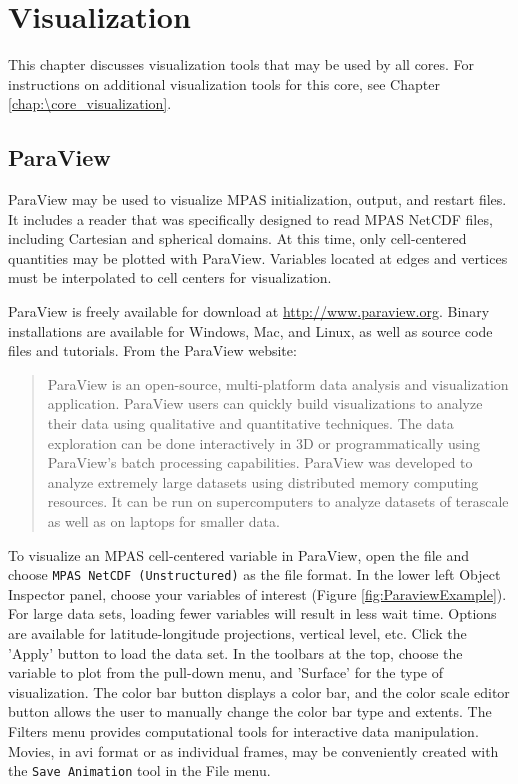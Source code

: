 
\chapter{Visualization}
\label{chap:mpas_visualization}

This chapter discusses visualization tools that may be used by all cores.  For instructions on additional visualization tools for this core, see Chapter \ref{chap:\core_visualization}.

\section{ParaView}

ParaView may be used to visualize MPAS initialization, output, and restart files.  It includes a reader that was specifically designed to read MPAS NetCDF files, including Cartesian and spherical domains.  At this time, only cell-centered quantities may be plotted with ParaView.  Variables located at edges and vertices must be interpolated to cell centers for visualization.

ParaView is freely available for download at \url{http://www.paraview.org}.  Binary installations are available for Windows, Mac, and Linux, as well as source code files and tutorials.  From the ParaView website:
\begin{quotation}
ParaView is an open-source, multi-platform data analysis and visualization application. ParaView users can quickly build visualizations to analyze their data using qualitative and quantitative techniques. The data exploration can be done interactively in 3D or programmatically using ParaView's batch processing capabilities.  ParaView was developed to analyze extremely large datasets using distributed memory computing resources. It can be run on supercomputers to analyze datasets of terascale as well as on laptops for smaller data.
\end{quotation}

To visualize an MPAS cell-centered variable in ParaView, open the file and choose {\tt MPAS NetCDF (Unstructured)} as the file format.  In the lower left Object Inspector panel, choose your variables of interest (Figure \ref{fig:ParaviewExample}).  For large data sets, loading fewer variables will result in less wait time.  Options are available for latitude-longitude projections, vertical level, etc.  Click the 'Apply' button to load the data set.  In the toolbars at the top, choose the variable to plot from the pull-down menu, and 'Surface' for the type of visualization.  The color bar button displays a color bar, and the color scale editor button allows the user to manually change the color bar type and extents.  The Filters menu provides computational tools for interactive data manipulation.  Movies, in avi format or as individual frames, may be conveniently created with the {\tt Save Animation} tool in the File menu.

